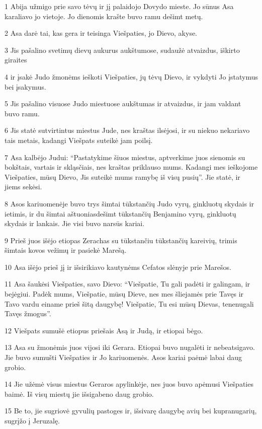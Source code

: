 \par 1 Abija užmigo prie savo tėvų ir jį palaidojo Dovydo mieste. Jo sūnus Asa karaliavo jo vietoje. Jo dienomis krašte buvo ramu dešimt metų. 
\par 2 Asa darė tai, kas gera ir teisinga Viešpaties, jo Dievo, akyse. 
\par 3 Jis pašalino svetimų dievų aukurus aukštumose, sudaužė atvaizdus, iškirto giraites 
\par 4 ir įsakė Judo žmonėms ieškoti Viešpaties, jų tėvų Dievo, ir vykdyti Jo įstatymus bei įsakymus. 
\par 5 Jis pašalino visuose Judo miestuose aukštumas ir atvaizdus, ir jam valdant buvo ramu. 
\par 6 Jis statė sutvirtintus miestus Jude, nes kraštas ilsėjosi, ir su niekuo nekariavo tais metais, kadangi Viešpats suteikė jam poilsį. 
\par 7 Asa kalbėjo Judui: “Pastatykime šiuos miestus, aptverkime juos sienomis su bokštais, vartais ir skląsčiais, nes kraštas priklauso mums. Kadangi mes ieškojome Viešpaties, mūsų Dievo, Jis suteikė mums ramybę iš visų pusių”. Jie statė, ir jiems sekėsi. 
\par 8 Asos kariuomenėje buvo trys šimtai tūkstančių Judo vyrų, ginkluotų skydais ir ietimis, ir du šimtai aštuoniasdešimt tūkstančių Benjamino vyrų, ginkluotų skydais ir lankais. Jie visi buvo narsūs kariai. 
\par 9 Prieš juos išėjo etiopas Zerachas su tūkstančiu tūkstančių kareivių, trimis šimtais kovos vežimų ir pasiekė Marešą. 
\par 10 Asa išėjo prieš jį ir išsirikiavo kautynėms Cefatos slėnyje prie Marešos. 
\par 11 Asa šaukėsi Viešpaties, savo Dievo: “Viešpatie, Tu gali padėti ir galingam, ir bejėgiui. Padėk mums, Viešpatie, mūsų Dieve, nes mes šliejamės prie Tavęs ir Tavo vardu einame prieš šitą daugybę! Viešpatie, Tu esi mūsų Dievas, tenenugali Tavęs žmogus”. 
\par 12 Viešpats sumušė etiopus priešais Asą ir Judą, ir etiopai bėgo. 
\par 13 Asa su žmonėmis juos vijosi iki Gerara. Etiopai buvo nugalėti ir nebeatsigavo. Jie buvo sumušti Viešpaties ir Jo kariuomenės. Asos kariai paėmė labai daug grobio. 
\par 14 Jie užėmė visus miestus Geraros apylinkėje, nes juos buvo apėmusi Viešpaties baimė. Iš visų miestų jie išsigabeno daug grobio. 
\par 15 Be to, jie sugriovė gyvulių pastoges ir, išsivarę daugybę avių bei kupranugarių, sugrįžo į Jeruzalę.




